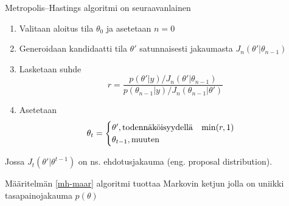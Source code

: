 \begin{maar}\label{mh-maar}
	Metropolis--Hastings algoritmi on seuraavanlainen
	\begin{enumerate}
		\item Valitaan aloitus tila $\theta_0$ ja asetetaan $n=0$
		\item Generoidaan kandidaatti tila $\theta'$ satunnaisesti jakaumasta $J_n(\theta'|\theta_{n-1})$
		\item Lasketaan suhde
		\begin{displaymath}
			r = \frac{p(\theta'|y)/J_n(\theta'|\theta_{n-1})}{p(\theta_{n-1}|y)/J_n(\theta_{n-1}|\theta')}
		\end{displaymath}
		\item Asetetaan
		\begin{displaymath}
			\theta_t= 
			\begin{cases}
				\theta', \text{todennäköisyydellä} \hspace{0.3cm} \min(r,1) \\
				\theta_{t-1}, \text{muuten}
			\end{cases}
		\end{displaymath}
	\end{enumerate}
	Jossa $J_t(\theta'|\theta^{t-1})$ on ns. ehdotusjakauma (eng. proposal distribution).
\end{maar}

\begin{lause}
	Määritelmän \ref{mh-maar} algoritmi tuottaa Markovin ketjun jolla on uniikki tasapainojakauma $p(\theta)$ 
\end{lause}

